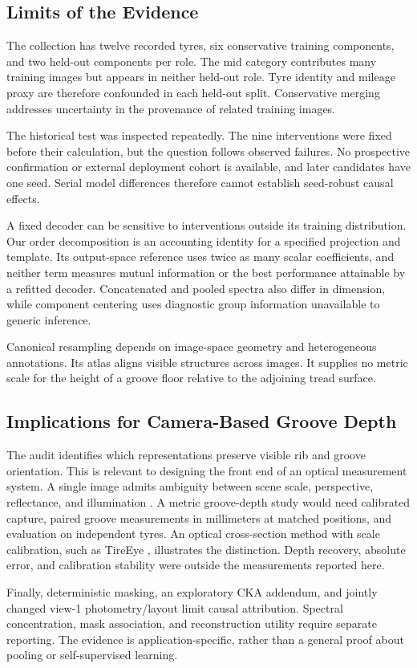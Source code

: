 \subsection{Limits of the Evidence}
The collection has twelve recorded tyres, six conservative training components, and two held-out components per role. The mid category contributes many training images but appears in neither held-out role. Tyre identity and mileage proxy are therefore confounded in each held-out split. Conservative merging addresses uncertainty in the provenance of related training images.

The historical test was inspected repeatedly. The nine interventions were fixed before their calculation, but the question follows observed failures. No prospective confirmation or external deployment cohort is available, and later candidates have one seed. Serial model differences therefore cannot establish seed-robust causal effects.

A fixed decoder can be sensitive to interventions outside its training distribution. Our order decomposition is an accounting identity for a specified projection and template. Its output-space reference uses twice as many scalar coefficients, and neither term measures mutual information or the best performance attainable by a refitted decoder. Concatenated and pooled spectra also differ in dimension, while component centering uses diagnostic group information unavailable to generic inference.

Canonical resampling depends on image-space geometry and heterogeneous annotations. Its atlas aligns visible structures across images. It supplies no metric scale for the height of a groove floor relative to the adjoining tread surface.

\subsection{Implications for Camera-Based Groove Depth}
The audit identifies which representations preserve visible rib and groove orientation. This is relevant to designing the front end of an optical measurement system. A single image admits ambiguity between scene scale, perspective, reflectance, and illumination \cite{eigondepth}. A metric groove-depth study would need calibrated capture, paired groove measurements in millimeters at matched positions, and evaluation on independent tyres. An optical cross-section method with scale calibration, such as TireEye \cite{tireeye}, illustrates the distinction. Depth recovery, absolute error, and calibration stability were outside the measurements reported here.

Finally, deterministic masking, an exploratory CKA addendum, and jointly changed view-1 photometry/layout limit causal attribution. Spectral concentration, mask association, and reconstruction utility require separate reporting. The evidence is application-specific, rather than a general proof about pooling or self-supervised learning.
